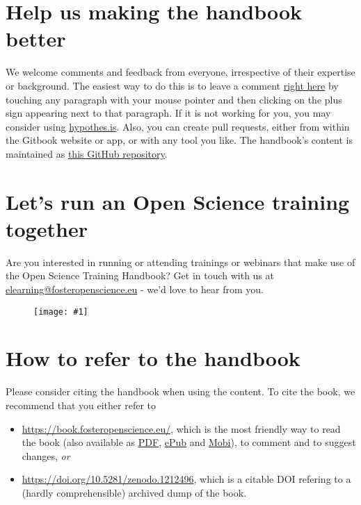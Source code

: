 \documentclass{article}
\newlength{\imgwidth}
\newcommand\scaledgraphics[2]{%
                
\settowidth{\imgwidth}{\texttt{[image: \#1]}}%
                
\setlength{\imgwidth}{\minof{\imgwidth}{#2\textwidth}}%
                
\texttt{[image: \#1]}%
                
}
\begin{document}
\section{Help us making the handbook better}\label{H3046972}



We welcome comments and feedback from everyone, irrespective of their expertise or background. The easiest way to do this is to leave a comment \href{https://book.fosteropenscience.eu/}{right here} by touching any paragraph with your mouse pointer and then clicking on the plus sign appearing next to that paragraph. If it is not working for you, you may consider using \href{https://via.hypothes.is/https://open-science-training-handbook.gitbook.io/book}{hypothes.is}. Also, you can create pull requests, either from within the Gitbook website or app, or with any tool you like. The handbook's content is maintained as \href{https://github.com/Open-Science-Training-Handbook}{this GitHub repository}.


\section{Let's run an Open Science training together}\label{H8885178}



Are you interested in running or attending trainings or webinars that make use of the Open Science Training Handbook? Get in touch with us at \href{mailto:elearning@fosteropenscience.eu}{elearning@fosteropenscience.eu} - we'd love to hear from you.

\begin{figure}
\scaledgraphics{1d13409d-cd97-40cd-ad54-a335b152b9af.png}{1}
\label{F61093731}
\end{figure}


\section{How to refer to the handbook}\label{H4508197}



Please consider citing the handbook when using the content. To cite the book, we recommend that you either refer to

\begin{itemize}
\item \href{https://book.fosteropenscience.eu/}{https://book.fosteropenscience.eu/}, which is the most friendly way to read the book (also available as \href{https://legacy.gitbook.com/download/pdf/book/open-science-training-handbook/book}{PDF}, \href{https://legacy.gitbook.com/download/epub/book/open-science-training-handbook/book}{ePub} and \href{https://legacy.gitbook.com/download/mobi/book/open-science-training-handbook/book}{Mobi}), to comment and to suggest changes, \emph{or}


\item \href{https://doi.org/10.5281/zenodo.1212496}{https://doi.org/10.5281/zenodo.1212496}, which is a citable DOI refering to a (hardly comprehensible) archived dump of the book.


\end{itemize}
\end{document}
